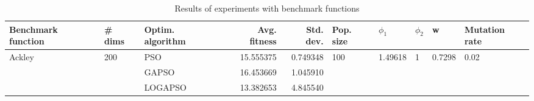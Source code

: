 \begin{table}
\centering
\caption{Results of experiments with benchmark functions}
\begin{tabular}{lllrrlllll}
\toprule
     Benchmark function &              \# dims & Optim. algorithm &  Avg. fitness &  Std. dev. &            Pop. size &               $\phi_{1}$ &         $\phi_{2}$ &                       w &         Mutation rate \\
\midrule
\multirow{3}{*}{Ackley} & \multirow{3}{*}{200} &              PSO &     15.555375 &   0.749348 & \multirow{3}{*}{100} & \multirow{3}{*}{1.49618} & \multirow{3}{*}{1} & \multirow{3}{*}{0.7298} & \multirow{3}{*}{0.02} \\
                        &                      &            GAPSO &     16.453669 &   1.045910 &                      &                          &                    &                         &                       \\
                        &                      &          LOGAPSO &     13.382653 &   4.845540 &                      &                          &                    &                         &                       \\
\bottomrule
\end{tabular}
\end{table}
